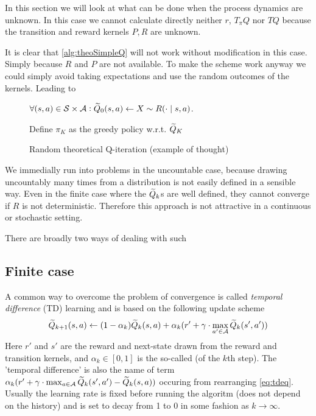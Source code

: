 
In this section we will look at what can be done when the process dynamics
are unknown.
In this case we cannot calculate directly neither $r$, $T_\pi Q$ nor
$TQ$ because the transition and reward kernels $P,R$ are unknown.

It is clear that \cref{alg:theoSimpleQ} will not work without
modification in this case. Simply because $R$ and $P$ are not
available.
To make the scheme work anyway we could simply avoid taking expectations
and use the random outcomes of the kernels.
Leading to

\begin{figure}[H]
\begin{algorithm}[H] %
  \caption{Random theoretical Q-iteration (example of thought)}
$\forall (s, a) \in \mathcal{S} \times \mathcal{A} :
\widetilde{Q}_0(s, a) \leftarrow X \sim R(\cdot \mid s, a)$.

Define $\pi_K$ as the greedy policy w.r.t. $\widetilde{Q}_K$ \\
\label{alg:theoRandomQ}
\end{algorithm}
\end{figure}
We immedially run into problems in the uncountable case, because
drawing uncountably many times from a distribution is not easily
defined in a sensible way.
Even in the finite case where the $\widetilde{Q}_k$s
are well defined, they cannot converge if $R$ is not deterministic.
Therefore this approach is not attractive in a continuous or
stochastic setting.

There are broadly two ways of dealing with such 

\subsection{Finite case}

A common way to overcome the problem of convergence
is called \emph{temporal difference} (TD) learning and is based on the following
update scheme
\begin{equation}
  \widetilde{Q}_{k+1}(s, a) \leftarrow (1-\alpha_k) \widetilde{Q}_k(s, a)
  + \alpha_k (r' + \gamma \cdot \max_{a' \in \mathcal{A}} \widetilde{Q}_k(s', a'))
  \label{eq:tdeq}
\end{equation}
Here $r'$ and $s'$ are the reward and next-state drawn from the
reward and transition kernels,
and $\alpha_k \in [0,1]$ is the so-called 
(of the $k$th step).
The 'temporal difference' is also the name of term
$ \alpha_k ( r' + \gamma \cdot \max_{a \in \mathcal{A}} \widetilde{Q}_k(s', a')
- \widetilde{Q}_k(s, a) )$ occuring from rearranging \cref{eq:tdeq}.
Usually the learning rate is fixed before running the algoritm
(does not depend on the history) and is set to decay
from 1 to 0 in some fashion as $k \to \infty$.

